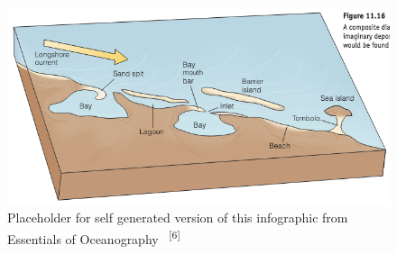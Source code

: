 \documentclass{article}
\begin{document}
\newpage
{}
\fancyfoot[C]{\thepage} 
\thispagestyle{fancy}

\begin{figure}
    \centering
    \includegraphics[width=.9\linewidth]{images/coastal-morphology.png}
    \caption{Placeholder for self generated version of this infographic from Essentials of Oceanography ~\textsuperscript{[6]}}
    \label{figure7}
\end{figure}
\end{document}
